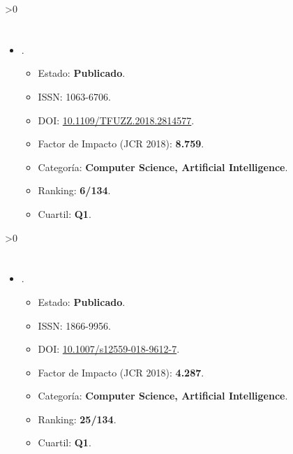 \documentclass[c5paper,10pt,twoside]{book}	   	%
\newcounter{incluirPDF}
\newcommand{\doi}[1]{\href{https://doi.org/#1}{#1}}
\newcommand{\incluirPaper}[2]{
	\ifnum\value{incluirPDF}>0 {
		
		\clearpage
		
		
		
		\cleardoublepage
		
	}\fi
}
\begin{document}
\incluirPaper{-}{./Papers/2018-Garcia-Wiley}





\section{}

\begin{itemize}
	\item \sloppy {}.
	
	\begin{itemize}
		\item Estado: \textbf{Publicado}.
		\item ISSN: 1063-6706.
		\item DOI: \doi{10.1109/TFUZZ.2018.2814577}.
		\item Factor de Impacto (JCR 2018): \textbf{8.759}.
		\item Categoría: \textbf{Computer Science, Artificial Intelligence}.
		\item Ranking: \textbf{6/134}.
		\item Cuartil: \textbf{Q1}.
	\end{itemize}
\end{itemize}

\incluirPaper{-}{./Papers/2018-Garcia-IEEE_TFS}








\section{}

\begin{itemize}
	\item {}.
	
	\begin{itemize}
		\item Estado: \textbf{Publicado}.
		\item ISSN: 1866-9956.
		\item DOI: \doi{10.1007/s12559-018-9612-7}.
		\item Factor de Impacto (JCR 2018): \textbf{4.287}.
		\item Categoría: \textbf{Computer Science, Artificial Intelligence}.
		\item Ranking: \textbf{25/134}.
		\item Cuartil: \textbf{Q1}.
	\end{itemize}
\end{itemize}
\end{document}
